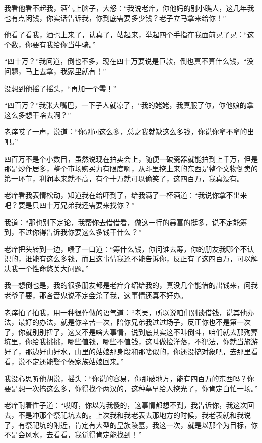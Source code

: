 我看他看不起我，酒气上脑子，大怒：“我说老痒，你他妈的别小瞧人，这几年我也有点闲钱，你实话告诉我，你到底需要多少钱？老子立马拿来给你！”

他看了看我，酒也上来了，认真了，站起来，举起四个手指在我面前晃了晃：“这个数，你要有我给你当牛骑。”

“四十万？”我问道，倒也不多，现在四十万要说是巨款，倒也真不算什么钱，“没问题，马上去拿，我家里就有！”

没想到他摇了摇头，“再加一个零！”

“四百万？”我张大嘴巴，一下子人就凉了，“我的姥姥，我真服了你，你他娘的拿这么多想干啥去啊？”

老痒哎了一声，说道：“你别问这么多，总之我就缺这么多钱，你说你拿不拿的出吧。”

四百万不是个小数目，虽然说现在拍卖会上，随便一破瓷器就能拍到上千万，但是那是炒作居多，整个市场购买力有限度啊，从斗里挖上来的东西是整个文物倒卖的第一环节，利润本来就不高，有个十万就可以偷笑了，这四百万，我真没有。

老痒看我表情松动，知道我在给吓到了，给我满了一杯酒道：“我说你拿不出来吧？要是只四十万兄弟我还需要来找你？”

我道：“那也别下定论，我帮你去借借看，做这一行的暴富的挺多，说不定能筹到，不过你得告诉我你要这么多钱干什么？”

老痒把头转到一边，啧了一口道：“筹什么钱，你问谁去筹，你的朋友我哪个不认识的，谁能有这么多钱，而且这事情我还不能告诉你，反正有了这四百万，可以解决我一个性命悠关大问题。”

我一想倒也是，我的很多朋友都是老痒介绍给我的，真没几个能借的出钱来，问我老爷子要，那吝啬鬼说不定会杀了我，这事情还真不好办。

老痒拍了拍我，用一种很作做的语气道：“老吴，所以说咱们别谈借钱，说其他办法，最好的办法，就是你辛苦一次，陪你兄弟我过过场子，反正你也不是第一次了，你就别别扭了，这又不是啥大事情，说到底其实这不叫倒斗，咱们就去那殉葬坑里，你给我挑挑，哪些值钱，哪些不值钱，这叫做捡洋落，不犯法，你就当旅游好了，那边好山好水，山里的姑娘那身段和那啥似的，你还没搞对象吧，去那里看看，说不定还能娶个傣家族姑娘回来。”

我没心思听他胡说，摇头：“你说的容易，你那破地方，能有四百万的东西吗？你要是想一次搞这么多，你得找个两汉的，这种墓早给人挖光了，你肯定白忙一场。”

老痒耐着性子道：“哎呀，你以为我傻的，这事情都想不到，我告诉你，我这次回去，不是冲那个祭祀坑去的。上次我和我老表去那地方的时候，我老表就和我说了，有祭祀坑的附近，肯定有大型的皇族陵墓，我这一次，就是以那个为目标，你不是会风水，去看看，我觉得肯定能找到！”

